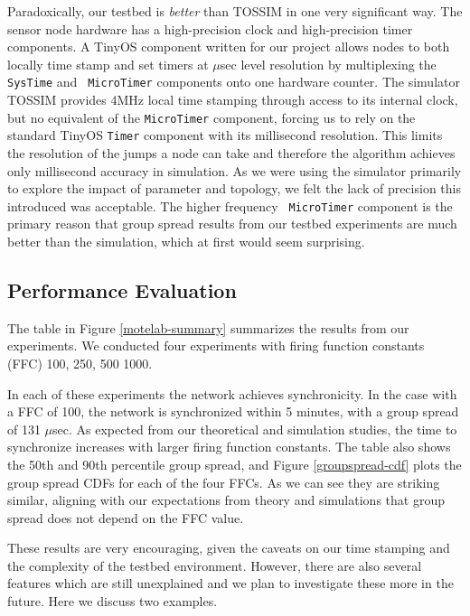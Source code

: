 Paradoxically, our testbed is {\em better} than TOSSIM in one very
significant way. The sensor node hardware has a high-precision clock
and high-precision timer components. A TinyOS component written for
our project allows nodes to both locally time stamp and set timers at
$\mu$sec level resolution by multiplexing the {\tt SysTime} and {\tt
MicroTimer} components onto one hardware counter. The simulator TOSSIM
provides 4MHz local time stamping through access to its internal
clock, but no equivalent of the {\tt MicroTimer} component, forcing us
to rely on the standard TinyOS {\tt Timer} component with its
millisecond resolution. This limits the resolution of the jumps a node
can take and therefore the algorithm achieves only millisecond
accuracy in simulation. As we were using the simulator primarily to
explore the impact of parameter and topology, we felt the lack of
precision this introduced was acceptable.  The higher frequency {\tt
MicroTimer} component is the primary reason that group spread results
from our testbed experiments are much better than the simulation,
which at first would seem surprising.

\subsection{Performance Evaluation} 

\label{performance-evaluation}


The table in Figure \ref{motelab-summary} summarizes the results from
our experiments. We conducted four experiments with firing function
constants (FFC) 100, 250, 500 1000.

In each of these experiments the network achieves synchronicity. In
the case with a FFC of 100, the network is synchronized within 5
minutes, with a group spread of 131 $\mu$sec. As expected from our
theoretical and simulation studies, the time to synchronize increases
with larger firing function constants. The table also shows the 50th
and 90th percentile group spread, and Figure \ref{groupspread-cdf}
plots the group spread CDFs for each of the four FFCs. As we can see
they are striking similar, aligning with our expectations from theory
and simulations that group spread does not depend on the FFC value.

These results are very encouraging, given the caveats on our time
stamping and the complexity of the testbed environment. However, there
are also several features which are still unexplained and we plan to
investigate these more in the future. Here we discuss two examples.

